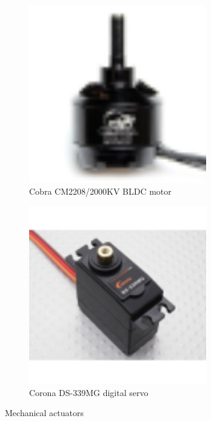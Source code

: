 \par
\begin{figure}[hbtp]
\begin{subfigure}{0.5\textwidth}
\centering
\includegraphics[width=0.85\textwidth]{figs/cobra-motor}
\caption{Cobra CM2208/2000KV BLDC motor~\cite{cobraimage}}
\label{fig:cobra}
\end{subfigure}
\begin{subfigure}{0.5\textwidth}
\centering
\includegraphics[width=0.85\textwidth]{figs/corona-servo}
\caption{Corona DS-339MG digital servo~\cite{hobbyking}}
\label{fig:corona}
\end{subfigure}
\caption{Mechanical actuators}
\vspace{-14pt}
\end{figure}
